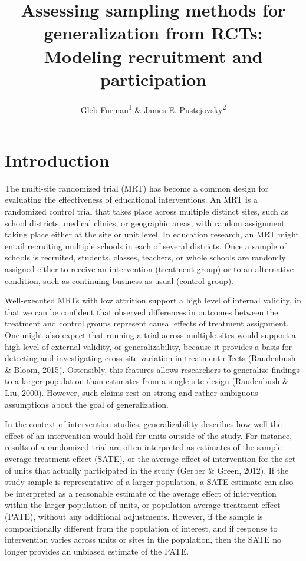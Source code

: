 \documentclass[
  english,
  man,floatsintext]{apa6}
\title{Assessing sampling methods for generalization from RCTs: Modeling recruitment and participation}
\author{Gleb Furman\textsuperscript{1} \& James E. Pustejovsky\textsuperscript{2}}
\date{}
\affiliation{\vspace{0.5cm}\textsuperscript{1} University of Texas at Austin\\\textsuperscript{2} University of Wisconsin-Madison}
\begin{document}
\maketitle

\hypertarget{introduction}{%
\section{Introduction}\label{introduction}}

The multi-site randomized trial (MRT) has become a common design for evaluating the effectiveness of educational interventions. An MRT is a randomized control trial that takes place across multiple distinct sites, such as school districts, medical clinics, or geographic areas, with random assignment taking place either at the site or unit level. In education research, an MRT might entail recruiting multiple schools in each of several districts. Once a sample of schools is recruited, students, classes, teachers, or whole schools are randomly assigned either to receive an intervention (treatment group) or to an alternative condition, such as continuing business-as-usual (control group).

Well-executed MRTs with low attrition support a high level of internal validity, in that we can be confident that observed differences in outcomes between the treatment and control groups represent causal effects of treatment assignment. One might also expect that running a trial across multiple sites would support a high level of external validity, or generalizability, because it provides a basis for detecting and investigating cross-site variation in treatment effects (Raudenbush \& Bloom, 2015).
Ostensibly, this features allows researchers to generalize findings to a larger population than estimates from a single-site design (Raudenbush \& Liu, 2000). However, such claims rest on strong and rather ambiguous assumptions about the goal of generalization.

In the context of intervention studies, generalizability describes how well the effect of an intervention would hold for units outside of the study.
For instance, results of a randomized trial are often interpreted as estimates of the sample average treatment effect (SATE), or the average effect of intervention for the set of units that actually participated in the study (Gerber \& Green, 2012).
If the study sample is representative of a larger population, a SATE estimate can also be interpreted as a reasonable estimate of the average effect of intervention within the larger population of units, or population average treatment effect (PATE), without any additional adjustments. However, if the sample is compositionally different from the population of interest, and if response to intervention varies across units or sites in the population, then the SATE no longer provides an unbiased estimate of the PATE.
\end{document}
